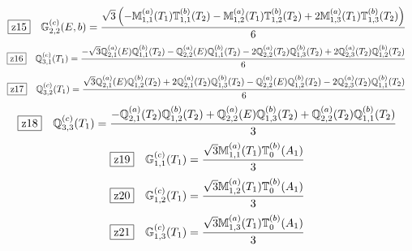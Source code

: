 \documentclass[fleqn,10pt,landscape]{jsarticle}
\begin{document}
\begin{dmath*}
\hspace*{3mm}\fbox{z15}\quad \mathbb{G}_{2,2}^{(c)}(E,b)=\frac{\sqrt{3} \left(- \mathbb{M}_{1,1}^{(a)}(T_{1}) \mathbb{T}_{1,1}^{(b)}(T_{2}) - \mathbb{M}_{1,2}^{(a)}(T_{1}) \mathbb{T}_{1,2}^{(b)}(T_{2}) + 2 \mathbb{M}_{1,3}^{(a)}(T_{1}) \mathbb{T}_{1,3}^{(b)}(T_{2})\right)}{6}
\end{dmath*}
\begin{dmath*}
\hspace*{3mm}\fbox{z16}\quad \mathbb{Q}_{3,1}^{(c)}(T_{1})=\frac{- \sqrt{3} \mathbb{Q}_{2,1}^{(a)}(E) \mathbb{Q}_{1,1}^{(b)}(T_{2}) - \mathbb{Q}_{2,2}^{(a)}(E) \mathbb{Q}_{1,1}^{(b)}(T_{2}) - 2 \mathbb{Q}_{2,2}^{(a)}(T_{2}) \mathbb{Q}_{1,3}^{(b)}(T_{2}) + 2 \mathbb{Q}_{2,3}^{(a)}(T_{2}) \mathbb{Q}_{1,2}^{(b)}(T_{2})}{6}
\end{dmath*}
\begin{dmath*}
\hspace*{3mm}\fbox{z17}\quad \mathbb{Q}_{3,2}^{(c)}(T_{1})=\frac{\sqrt{3} \mathbb{Q}_{2,1}^{(a)}(E) \mathbb{Q}_{1,2}^{(b)}(T_{2}) + 2 \mathbb{Q}_{2,1}^{(a)}(T_{2}) \mathbb{Q}_{1,3}^{(b)}(T_{2}) - \mathbb{Q}_{2,2}^{(a)}(E) \mathbb{Q}_{1,2}^{(b)}(T_{2}) - 2 \mathbb{Q}_{2,3}^{(a)}(T_{2}) \mathbb{Q}_{1,1}^{(b)}(T_{2})}{6}
\end{dmath*}
\begin{dmath*}
\hspace*{3mm}\fbox{z18}\quad \mathbb{Q}_{3,3}^{(c)}(T_{1})=\frac{- \mathbb{Q}_{2,1}^{(a)}(T_{2}) \mathbb{Q}_{1,2}^{(b)}(T_{2}) + \mathbb{Q}_{2,2}^{(a)}(E) \mathbb{Q}_{1,3}^{(b)}(T_{2}) + \mathbb{Q}_{2,2}^{(a)}(T_{2}) \mathbb{Q}_{1,1}^{(b)}(T_{2})}{3}
\end{dmath*}
\begin{dmath*}
\hspace*{3mm}\fbox{z19}\quad \mathbb{G}_{1,1}^{(c)}(T_{1})=\frac{\sqrt{3} \mathbb{M}_{1,1}^{(a)}(T_{1}) \mathbb{T}_{0}^{(b)}(A_{1})}{3}
\end{dmath*}
\begin{dmath*}
\hspace*{3mm}\fbox{z20}\quad \mathbb{G}_{1,2}^{(c)}(T_{1})=\frac{\sqrt{3} \mathbb{M}_{1,2}^{(a)}(T_{1}) \mathbb{T}_{0}^{(b)}(A_{1})}{3}
\end{dmath*}
\begin{dmath*}
\hspace*{3mm}\fbox{z21}\quad \mathbb{G}_{1,3}^{(c)}(T_{1})=\frac{\sqrt{3} \mathbb{M}_{1,3}^{(a)}(T_{1}) \mathbb{T}_{0}^{(b)}(A_{1})}{3}
\end{dmath*}
\end{document}

